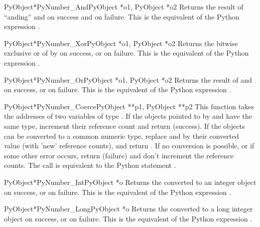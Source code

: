 \documentclass{manual}
\begin{document}
\begin{cfuncdesc}{PyObject*}{PyNumber_And}{PyObject *o1, PyObject *o2}
Returns the result of ``anding''  and  on success and
\NULL{} on failure. This is the equivalent of the Python
expression .
\end{cfuncdesc}


\begin{cfuncdesc}{PyObject*}{PyNumber_Xor}{PyObject *o1, PyObject *o2}
Returns the bitwise exclusive or of  by  on success,
or \NULL{} on failure.  This is the equivalent of the Python
expression .
\end{cfuncdesc}

\begin{cfuncdesc}{PyObject*}{PyNumber_Or}{PyObject *o1, PyObject *o2}
Returns the result of  and  on success, or \NULL{} on
failure.  This is the equivalent of the Python expression
.
\end{cfuncdesc}

\begin{cfuncdesc}{PyObject*}{PyNumber_Coerce}{PyObject **p1, PyObject **p2}
This function takes the addresses of two variables of type
.  If the objects pointed to by  and
 have the same type, increment their reference count
and return  (success). If the objects can be converted to a
common numeric type, replace  and  by their
converted value (with 'new' reference counts), and return .
If no conversion is possible, or if some other error occurs, return
 (failure) and don't increment the reference counts.  The
call  is equivalent to the Python
statement .
\end{cfuncdesc}

\begin{cfuncdesc}{PyObject*}{PyNumber_Int}{PyObject *o}
Returns the  converted to an integer object on success, or
\NULL{} on failure.  This is the equivalent of the Python
expression .
\end{cfuncdesc}

\begin{cfuncdesc}{PyObject*}{PyNumber_Long}{PyObject *o}
Returns the  converted to a long integer object on success,
or \NULL{} on failure.  This is the equivalent of the Python
expression .
\end{cfuncdesc}
\end{document}
